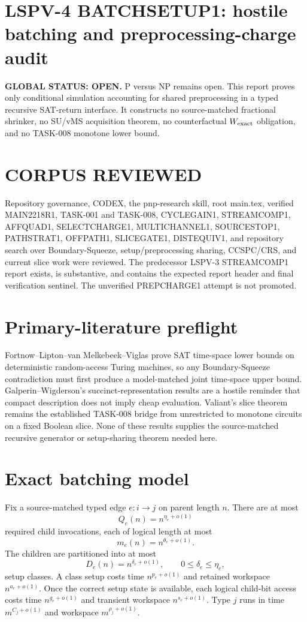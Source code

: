 \documentclass[11pt]{article}
\begin{document}
\section*{LSPV-4 BATCHSETUP1: hostile batching and preprocessing-charge audit}
\textbf{GLOBAL STATUS: OPEN.} P versus NP remains open. This report proves only conditional simulation accounting for shared preprocessing in a typed recursive SAT-return interface. It constructs no source-matched fractional shrinker, no SU/vMS acquisition theorem, no counterfactual $W_{\rm exact}$ obligation, and no TASK-008 monotone lower bound.

\section*{CORPUS REVIEWED}
Repository governance, CODEX, the pnp-research skill, root main.tex, verified MAIN2218R1, TASK-001 and TASK-008, CYCLEGAIN1, STREAMCOMP1, AFFQUAD1, SELECTCHARGE1, MULTICHANNEL1, SOURCESTOP1, PATHSTRAT1, OFFPATH1, SLICEGATE1, DISTEQUIV1, and repository search over Boundary-Squeeze, setup/preprocessing sharing, CCSPC/CRS, and current slice work were reviewed. The predecessor LSPV-3 STREAMCOMP1 report exists, is substantive, and contains the expected report header and final verification sentinel. The unverified PREPCHARGE1 attempt is not promoted.

\section*{Primary-literature preflight}
Fortnow--Lipton--van Melkebeek--Viglas prove SAT time-space lower bounds on deterministic random-access Turing machines, so any Boundary-Squeeze contradiction must first produce a model-matched joint time-space upper bound. Galperin--Wigderson's succinct-representation results are a hostile reminder that compact description does not imply cheap evaluation. Valiant's slice theorem remains the established TASK-008 bridge from unrestricted to monotone circuits on a fixed Boolean slice. None of these results supplies the source-matched recursive generator or setup-sharing theorem needed here.

\section*{Exact batching model}
Fix a source-matched typed edge $e:i\to j$ on parent length $n$. There are at most
\[
Q_e(n)=n^{\eta_e+o(1)}
\]
required child invocations, each of logical length at most
\[
m_e(n)=n^{\theta_e+o(1)}.
\]
The children are partitioned into at most
\[
D_e(n)=n^{\delta_e+o(1)},\qquad 0\le\delta_e\le\eta_e,
\]
setup classes. A class setup costs time $n^{p_e+o(1)}$ and retained workspace $n^{a_e+o(1)}$. Once the correct setup state is available, each logical child-bit access costs time $n^{g_e+o(1)}$ and transient workspace $n^{s_e+o(1)}$. Type $j$ runs in time $m^{C_j+o(1)}$ and workspace $m^{\rho_j+o(1)}$.
\end{document}
